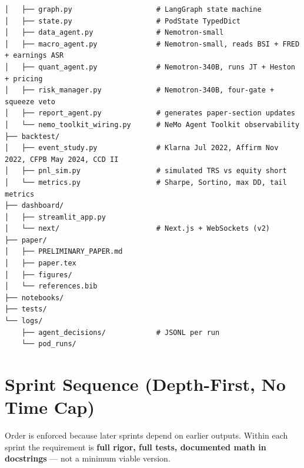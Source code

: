 \documentclass[11pt]{article}
\begin{document}
\begin{lstlisting}
│   ├── graph.py                    # LangGraph state machine
│   ├── state.py                    # PodState TypedDict
│   ├── data_agent.py               # Nemotron-small
│   ├── macro_agent.py              # Nemotron-small, reads BSI + FRED + earnings ASR
│   ├── quant_agent.py              # Nemotron-340B, runs JT + Heston + pricing
│   ├── risk_manager.py             # Nemotron-340B, four-gate + squeeze veto
│   ├── report_agent.py             # generates paper-section updates
│   └── nemo_toolkit_wiring.py      # NeMo Agent Toolkit observability
├── backtest/
│   ├── event_study.py              # Klarna Jul 2022, Affirm Nov 2022, CFPB May 2024, CCD II
│   ├── pnl_sim.py                  # simulated TRS vs equity short
│   └── metrics.py                  # Sharpe, Sortino, max DD, tail metrics
├── dashboard/
│   ├── streamlit_app.py
│   └── next/                       # Next.js + WebSockets (v2)
├── paper/
│   ├── PRELIMINARY_PAPER.md
│   ├── paper.tex
│   ├── figures/
│   └── references.bib
├── notebooks/
├── tests/
└── logs/
    ├── agent_decisions/            # JSONL per run
    └── pod_runs/
\end{lstlisting}

\section{Sprint Sequence (Depth-First, No Time Cap)}

Order is enforced because later sprints depend on earlier outputs. Within each sprint the requirement is \textbf{full rigor, full tests, documented math in docstrings} --- not a minimum viable version.
\end{document}
